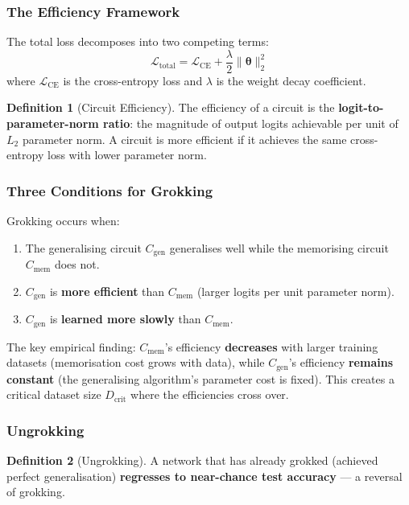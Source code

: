 \documentclass[11pt, a4paper]{article}
\theoremstyle{definition}
\newtheorem{definition}{Definition}[section]
\theoremstyle{plain}
\begin{document}
\subsubsection{The Efficiency Framework}

The total loss decomposes into two competing terms:
\begin{equation}
  \mathcal{L}_{\text{total}} = \mathcal{L}_{\text{CE}} + \frac{\lambda}{2}\|\boldsymbol{\theta}\|_2^2
\end{equation}
where $\mathcal{L}_{\text{CE}}$ is the cross-entropy loss and $\lambda$ is the weight decay coefficient.

\begin{definition}[Circuit Efficiency]
The efficiency of a circuit is the \textbf{logit-to-parameter-norm ratio}: the magnitude of output logits achievable per unit of $L_2$ parameter norm. A circuit is more efficient if it achieves the same cross-entropy loss with lower parameter norm.
\end{definition}

\subsubsection{Three Conditions for Grokking}

Grokking occurs when:
\begin{enumerate}
  \item The generalising circuit $C_{\text{gen}}$ generalises well while the memorising circuit $C_{\text{mem}}$ does not.
  \item $C_{\text{gen}}$ is \textbf{more efficient} than $C_{\text{mem}}$ (larger logits per unit parameter norm).
  \item $C_{\text{gen}}$ is \textbf{learned more slowly} than $C_{\text{mem}}$.
\end{enumerate}

The key empirical finding: $C_{\text{mem}}$'s efficiency \textbf{decreases} with larger training datasets (memorisation cost grows with data), while $C_{\text{gen}}$'s efficiency \textbf{remains constant} (the generalising algorithm's parameter cost is fixed). This creates a critical dataset size $D_{\text{crit}}$ where the efficiencies cross over.

\subsubsection{Ungrokking}

\begin{definition}[Ungrokking]
A network that has already grokked (achieved perfect generalisation) \textbf{regresses to near-chance test accuracy} --- a reversal of grokking.
\end{definition}
\end{document}
